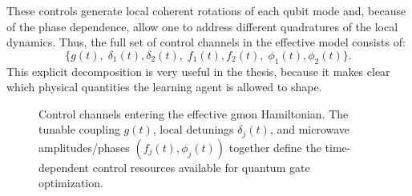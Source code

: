 These controls generate local coherent rotations of each qubit mode and, because of the phase dependence, allow one to address different quadratures of the local dynamics. Thus, the full set of control channels in the effective model consists of:
\begin{equation}
\bigl\{
g(t),\;
\delta_1(t),\delta_2(t),\;
f_1(t),f_2(t),\;
\phi_1(t),\phi_2(t)
\bigr\}.
\label{eq:gmon_control_channels}
\end{equation}
This explicit decomposition is very useful in the thesis, because it makes clear which physical quantities the learning agent is allowed to shape.

\tikzexternaldisable
\begin{figure}[t]
\centering
{}
\caption{Control channels entering the effective gmon Hamiltonian. The tunable coupling $g(t)$, local detunings $\delta_j(t)$, and microwave amplitudes/phases $(f_j(t),\phi_j(t))$ together define the time-dependent control resources available for quantum gate optimization.}
\label{fig:gmon_control_channels}
\end{figure}
\tikzexternalenable


